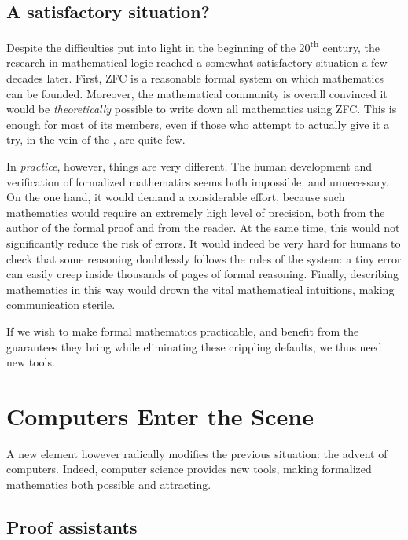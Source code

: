 \subsection{A satisfactory situation?}

Despite the difficulties put into light in the beginning of the 20\textsuperscript{th}
century, the research in mathematical logic reached a somewhat satisfactory situation
a few decades later.
First, ZFC is a reasonable formal system on which mathematics can be founded. Moreover,
the mathematical community is overall convinced it would be \emph{theoretically} possible
to write down all mathematics using ZFC. This is enough for most of its members,
even if those who attempt to actually give it a try, in the vein of the
, are quite few.

In \emph{practice}, however, things are very different. The human development and
verification of formalized mathematics%
seems both impossible, and unnecessary.
On the one hand, it would demand a considerable effort, because such mathematics would
require an extremely high level of precision, both from the author of the formal proof
and from the reader. At the same time, this would not significantly reduce the risk of
errors. It would indeed be very hard for humans to check that some reasoning doubtlessly
follows the rules of the system: a tiny error can easily creep inside thousands of pages
of formal reasoning. Finally, describing mathematics in this way would drown the vital
mathematical intuitions, making communication sterile.

If we wish to make formal mathematics practicable, and benefit from the guarantees
they bring while eliminating these crippling defaults, we thus need new tools.

\section{Computers Enter the Scene}
\label{sec:proof-assistants}

A new element however radically modifies the previous situation: the advent of computers.
Indeed, computer science provides new tools, making formalized mathematics both possible
and attracting.

\subsection{Proof assistants}


